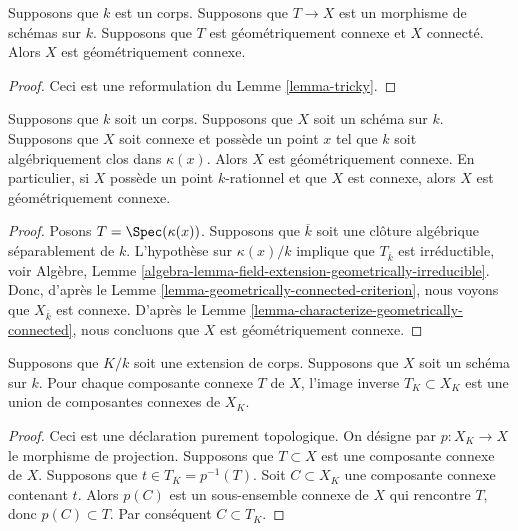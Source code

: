\begin{lemma}
\label{lemma-geometrically-connected-criterion}
\begin{reference}
\cite[IV Corollary 4.5.13.1(i)]{EGA}
\end{reference}
Supposons que $k$ est un corps. Supposons que $T \to X$ est un
morphisme de schémas sur $k$. Supposons que $T$ est
géométriquement connexe et $X$ connecté. Alors $X$ est géométriquement connexe.
\end{lemma}

\begin{proof}
Ceci est une reformulation
du Lemme \ref{lemma-tricky}.
\end{proof}

\begin{lemma}
\label{lemma-geometrically-connected-if-connected-and-point}
Supposons que $k$ soit un corps. Supposons que $X$ soit
un schéma sur $k$. Supposons que $X$ soit connexe et
possède un point $x$ tel que $k$ soit algébriquement clos
dans $\kappa(x)$. Alors $X$ est géométriquement connexe.
En particulier, si $X$ possède un point $k$-rationnel et
que $X$ est connexe, alors $X$ est géométriquement connexe.
\end{lemma}

\begin{proof}
Posons $T = \Spec(\kappa(x))$. Supposons que
$\overline{k}$ soit une clôture algébrique séparablement
de $k$. L'hypothèse sur $\kappa(x)/k$ implique que
$T_{\overline{k}}$ est irréductible, voir Algèbre, Lemme
\ref{algebra-lemma-field-extension-geometrically-irreducible}.
Donc, d'après le Lemme
\ref{lemma-geometrically-connected-criterion}, nous voyons que
$X_{\overline{k}}$ est connexe. D'après le Lemme
\ref{lemma-characterize-geometrically-connected}, nous concluons que $X$ est géométriquement connexe.
\end{proof}

\begin{lemma}
\label{lemma-inverse-image-connected-component}
Supposons que $K/k$ soit une extension de corps.
Supposons que $X$ soit un schéma sur $k$. Pour chaque
composante connexe $T$ de $X$, l'image inverse $T_K
\subset X_K$ est une union de composantes connexes de $X_K$.
\end{lemma}

\begin{proof}
Ceci est une déclaration purement topologique. On désigne par $p
: X_K \to X$ le morphisme de projection. Supposons que $T \subset
X$ est une composante connexe de $X$. Supposons que $t \in T_K =
p^{-1}(T)$. Soit $C \subset X_K$ une composante connexe
contenant $t$. Alors $p(C)$ est un sous-ensemble connexe de $X$ qui
rencontre $T$, donc $p(C) \subset T$. Par conséquent $C \subset T_K$.
\end{proof}

